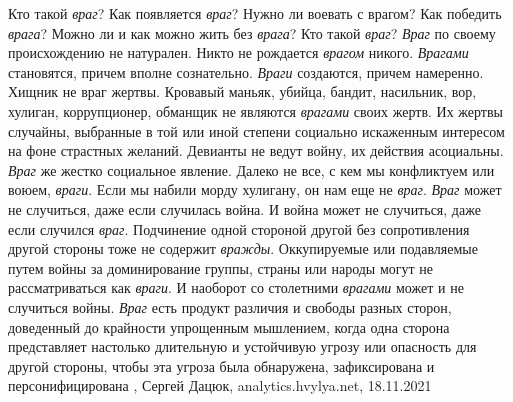 Кто такой \emph{враг}? Как появляется \emph{враг}? Нужно ли воевать с врагом?
Как победить \emph{врага}? Можно ли и как можно жить без \emph{врага}?  Кто
такой \emph{враг}?  \emph{Враг} по своему происхождению не натурален. Никто не
рождается \emph{врагом} никого.  \emph{Врагами} становятся, причем вполне
сознательно. \emph{Враги} создаются, причем намеренно.  Хищник не враг жертвы.
Кровавый маньяк, убийца, бандит, насильник, вор, хулиган, коррупционер,
обманщик не являются \emph{врагами} своих жертв. Их жертвы случайны, выбранные
в той или иной степени социально искаженным интересом на фоне страстных
желаний.  Девианты не ведут войну, их действия асоциальны. \emph{Враг} же
жестко социальное явление.  Далеко не все, с кем мы конфликтуем или воюем,
\emph{враги}. Если мы набили морду хулигану, он нам еще не \emph{враг}.
\emph{Враг} может не случиться, даже если случилась война. И война может не
случиться, даже если случился \emph{враг}.  Подчинение одной стороной другой
без сопротивления другой стороны тоже не содержит \emph{вражды}.  Оккупируемые
или подавляемые путем войны за доминирование группы, страны или народы могут не
рассматриваться как \emph{враги}. И наоборот со столетними \emph{врагами} может
и не случиться войны.  \emph{Враг} есть продукт различия и свободы разных
сторон, доведенный до крайности упрощенным мышлением, когда одна сторона
представляет настолько длительную и устойчивую угрозу или опасность для другой
стороны, чтобы эта угроза была обнаружена, зафиксирована и персонифицирована
, Сергей Дацюк, analytics.hvylya.net, 18.11.2021
